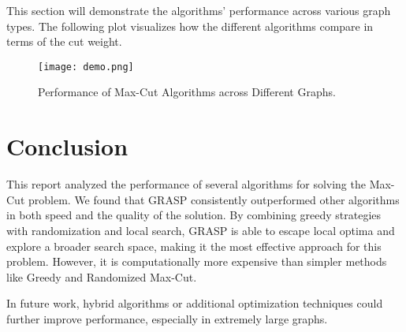 \documentclass[a4paper,12pt]{article}
\begin{document}
This section will demonstrate the algorithms' performance across various graph types. The following plot visualizes how the different algorithms compare in terms of the cut weight.

\begin{figure}[h!]
    \centering
    \texttt{[image: demo.png]}  %
    \caption{Performance of Max-Cut Algorithms across Different Graphs.}
    \label{fig:performance}
\end{figure}

\section*{Conclusion}

This report analyzed the performance of several algorithms for solving the Max-Cut problem. We found that GRASP consistently outperformed other algorithms in both speed and the quality of the solution. By combining greedy strategies with randomization and local search, GRASP is able to escape local optima and explore a broader search space, making it the most effective approach for this problem. However, it is computationally more expensive than simpler methods like Greedy and Randomized Max-Cut.

In future work, hybrid algorithms or additional optimization techniques could further improve performance, especially in extremely large graphs.
\end{document}
